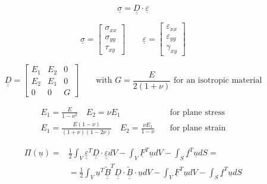 \documentclass[a4paper]{jpconf}
\begin{document}

\begin{equation}
\underline{\sigma}=\underline{\underline{D}}\cdot\underline{\varepsilon}
\end{equation}

\begin{equation}
\underline{\sigma}=\begin{bmatrix}
\sigma_{xx}\\\sigma_{yy}\\\tau_{xy}
\end{bmatrix}\qquad\underline{\varepsilon}=\begin{bmatrix}
\varepsilon_{xx}\\\varepsilon_{yy}\\\gamma_{xy}
\end{bmatrix}
\end{equation}

\begin{equation}
\underline{\underline{D}}=\begin{bmatrix}
E_{1}&E_{2}&0\\E_{2}&E_{1}&0\\0&0&G
\end{bmatrix}\qquad\text{with }G=\frac{E}{2\left(1+\nu\right)}\text{ for an isotropic material}
\end{equation}

\begin{equation}
\begin{split}
E_{1}=\frac{E}{1-\nu^{2}}\quad E_{2}=\nu E_{1}\quad&\text{for plane stress}\\
E_{1}=\frac{E\left(1-\nu\right)}{\left(1+\nu\right)\left(1-2\nu\right)}\quad E_{2}=\frac{\nu E_{1}}{1-\nu}\quad&\text{for plane strain}
\end{split}
\end{equation}

\begin{equation}
\begin{split}
\Pi\left(\underline{u}\right)=&\frac{1}{2}\int_{V}\underline{\underline{\varepsilon}}^{T}\underline{\underline{D}}\cdot\underline{\underline{\varepsilon}}dV-\int_{V}\underline{F}^{T}\underline{u}dV-\int_{S}\underline{f}^{T}\underline{u}dS=\\
&=\frac{1}{2}\int_{V}\underline{u}^{T}\underline{\underline{\widetilde{B}}}^{T}\underline{\underline{D}}\cdot\underline{\underline{\widetilde{B}}}\cdot\underline{u}dV-\int_{V}\underline{F}^{T}\underline{u}dV-\int_{S}\underline{f}^{T}\underline{u}dS
\end{split}
\end{equation}
\end{document}
